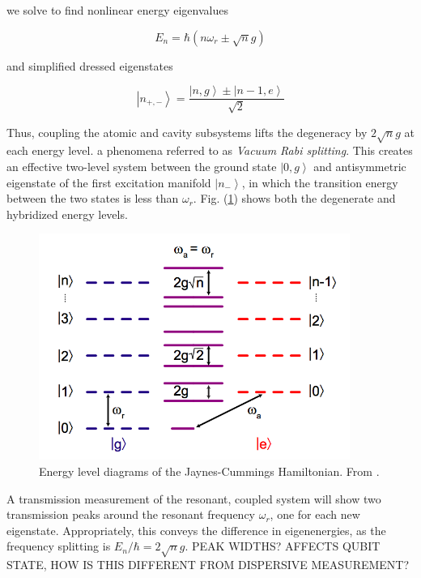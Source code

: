 \documentclass[12 pt]{book}
\newcommand{\ket}[1]{\left| #1 \right>} %
\begin{document}
we solve to find nonlinear energy eigenvalues

\begin{equation}\label{eq:NonlinearEnergies}
E_n = \hbar(n\omega_r\pm \sqrt{n}g)
\end{equation}

and simplified dressed eigenstates

\begin{equation}
\ket{n_{+,-}} = \frac{\ket{n,g}\pm\ket{n-1,e}}{\sqrt{2}}
\end{equation}

Thus, coupling the atomic and cavity subsystems lifts the degeneracy by $2\sqrt{n}g$ at each energy level. a phenomena referred to as \emph{Vacuum Rabi splitting}. This creates an effective two-level system between the ground state $\ket{0,g}$ and antisymmetric eigenstate of the first excitation manifold $\ket{n_-}$, in which the transition energy between the two states is less than $\omega_r$. Fig. (\ref{fig:EnergyLevels}) shows both the degenerate and hybridized energy levels. 

\begin{figure}[h] 
   \centering
   \includegraphics[width=4in]{SchusterResonantEnergyLevels.png} 
   \caption{Energy level diagrams of the Jaynes-Cummings Hamiltonian. From \cite{Schuster}.}
   \label{fig:EnergyLevels}
\end{figure}

A transmission measurement of the resonant, coupled system will show two transmission peaks around the resonant frequency $\omega_r$, one for each new eigenstate. Appropriately, this conveys the difference in eigenenergies, as the frequency splitting is $E_n/\hbar=2\sqrt{n}g$. PEAK WIDTHS? AFFECTS QUBIT STATE, HOW IS THIS DIFFERENT FROM DISPERSIVE MEASUREMENT?
\end{document}
